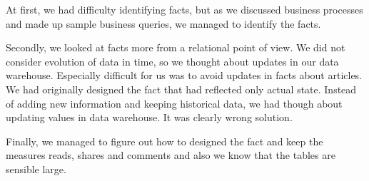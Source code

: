 
At first, we had difficulty identifying facts, but as we discussed business processes and made up sample business queries, we managed to identify the facts.

Secondly, we looked at facts more from a relational point of view. We did not consider evolution
of data in time, so we thought about updates in our data warehouse. Especially difficult for us was to avoid updates in facts about articles. We had originally designed the fact that had reflected only actual state. Instead of adding new information and keeping historical data, we had though about updating values in data warehouse. It was clearly wrong solution.

Finally, we managed to figure out how to designed the fact and keep the measures reads, shares and comments and also we know that the tables are sensible large.
